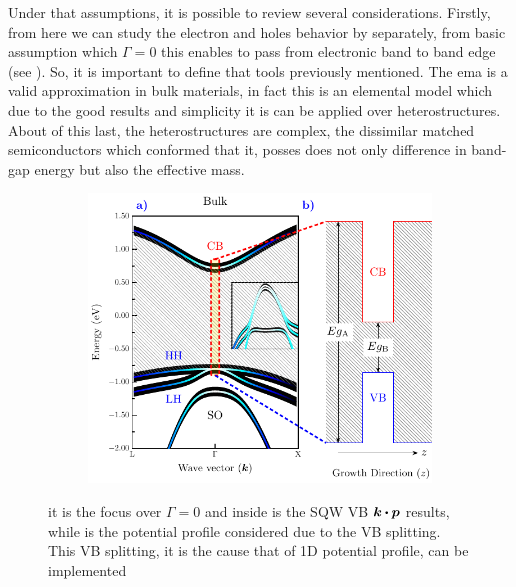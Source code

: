 Under that assumptions, it is possible to review several considerations.
Firstly, from here we can study the electron and holes behavior by separately, from basic assumption which $\Gamma=0$ this enables to pass from electronic band to band edge (see ). So, it is important to define that tools previously mentioned. The \gls{ema} is a valid approximation in bulk materials, in fact this is an elemental model which  due to the good results and simplicity it is can be applied over heterostructures.  About of this last, the heterostructures are complex, the dissimilar matched semiconductors which conformed that it, posses does not only difference in band-gap energy but also the effective mass.  

\begin{figure}[t!]
	\centering
	\begin{subfigure}{\textwidth}
	\includegraphics[width=\textwidth]{../figures/chapter-2/numerical-calculations/out/band-edge}
	\label{subfig:chapter-2-sec-numerical-calculations-band-edge-a}
	\label{subfig:chapter-2-sec-numerical-calculations-band-edge-b}
	\end{subfigure}
	\caption{ it is the focus over $\Gamma=0$ and inside is the SQW VB $\boldsymbol{k}\bigcdot \boldsymbol{p}$ results, while   is the potential profile considered due to the VB splitting. This VB splitting, it is the cause that of 1D potential profile, can be implemented}
	\label{fig:chapter-2-sec-numerical-calculations-band-edge}
\end{figure}

